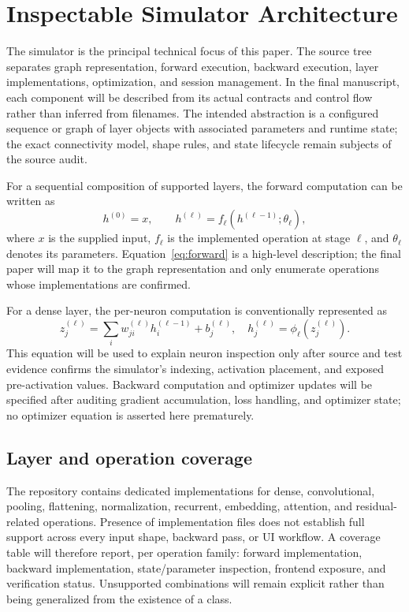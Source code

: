 \documentclass[conference]{IEEEtran}
\begin{document}
\section{Inspectable Simulator Architecture}
\label{sec:simulator}
The simulator is the principal technical focus of this paper. The source tree separates graph representation, forward execution, backward execution, layer implementations, optimization, and session management. In the final manuscript, each component will be described from its actual contracts and control flow rather than inferred from filenames. The intended abstraction is a configured sequence or graph of layer objects with associated parameters and runtime state; the exact connectivity model, shape rules, and state lifecycle remain subjects of the source audit.

For a sequential composition of supported layers, the forward computation can be written as
\begin{equation}
 h^{(0)}=x,\qquad h^{(\ell)}=f_{\ell}\!\left(h^{(\ell-1)};\theta_{\ell}\right),
 \label{eq:forward}
\end{equation}
where $x$ is the supplied input, $f_\ell$ is the implemented operation at stage $\ell$, and $\theta_\ell$ denotes its parameters. Equation~\eqref{eq:forward} is a high-level description; the final paper will map it to the graph representation and only enumerate operations whose implementations are confirmed.

For a dense layer, the per-neuron computation is conventionally represented as
\begin{equation}
 z_j^{(\ell)}=\sum_i w_{ji}^{(\ell)}h_i^{(\ell-1)}+b_j^{(\ell)},\quad
 h_j^{(\ell)}=\phi_\ell\!\left(z_j^{(\ell)}\right).
 \label{eq:dense}
\end{equation}
This equation will be used to explain neuron inspection only after source and test evidence confirms the simulator's indexing, activation placement, and exposed pre-activation values. Backward computation and optimizer updates will be specified after auditing gradient accumulation, loss handling, and optimizer state; no optimizer equation is asserted here prematurely.

\subsection{Layer and operation coverage}
The repository contains dedicated implementations for dense, convolutional, pooling, flattening, normalization, recurrent, embedding, attention, and residual-related operations. Presence of implementation files does not establish full support across every input shape, backward pass, or UI workflow. A coverage table will therefore report, per operation family: forward implementation, backward implementation, state/parameter inspection, frontend exposure, and verification status. Unsupported combinations will remain explicit rather than being generalized from the existence of a class.
\end{document}
